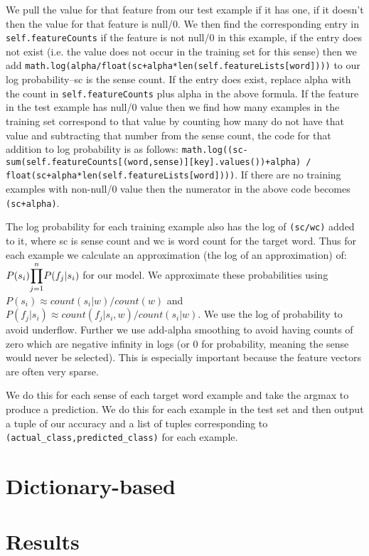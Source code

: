 \documentclass{article}
\begin{document}
We pull the value for that feature from our test example if it has one, if it doesn't then the value for that feature is null/0. We then find the corresponding entry in \texttt{self.featureCounts} if the feature is not null/0 in this example, if the entry does not exist (i.e. the value does not occur in the training set for this sense) then we add \texttt{math.log(alpha/float(sc+alpha*len(self.featureLists[word])))} to our log probability--sc is the sense count. If the entry does exist, replace alpha with the count in \texttt{self.featureCounts} plus alpha in the above formula. If the feature in the test example has null/0 value then we find how many examples in the training set correspond to that value by counting how many do not have that value and subtracting that number from the sense count, the code for that addition to log probability is as follows: \texttt{math.log((sc-sum(self.featureCounts[(word,sense)][key].values())+alpha) / float(sc+alpha*len(self.featureLists[word])))}. If there are no training examples with non-null/0 value then the numerator in the above code becomes \texttt{(sc+alpha)}.

The log probability for each training example also has the log of \texttt{(sc/wc)} added to it, where sc is sense count and wc is word count for the target word. Thus for each example we calculate an approximation (the log of an approximation) of: $P(s_i)\mathlarger{\prod}_{j=1}^{n}P(f_j|s_i)$ for our model. We approximate these probabilities using $P(s_i) \approx count(s_i|w)/count(w)$ and $P(f_j|s_i) \approx count(f_j|s_i,w)/count(s_i|w)$. We use the log of probability to avoid underflow. Further we use add-alpha smoothing to avoid having counts of zero which are negative infinity in logs (or 0 for probability, meaning the sense would never be selected). This is especially important because the feature vectors are often very sparse.

We do this for each sense of each target word example and take the argmax to produce a prediction. We do this for each example in the test set and then output a tuple of our accuracy and a list of tuples corresponding to \texttt{(actual\_class,predicted\_class)} for each example. 

\section{Dictionary-based}

\section{Results}
\end{document}
